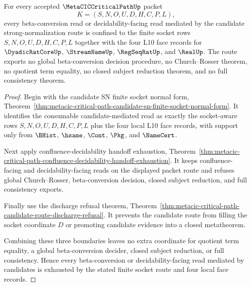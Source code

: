\begin{theorem}
\label{thm:metacic-critical-path-candidate-decider-exhaustion}
For every accepted $\MetaCICCriticalPathUp$ packet
$$
K=(S,N,O,U,D,H,C,P,L),
$$
every beta-conversion read or decidability-facing read mediated by the candidate strong-normalization route is confined to the finite socket rows $S,N,O,U,D,H,C,P,L$ together with the four L10 face records for $\DyadicRatCoreUp$, $\StreamNameUp$, $\RegSeqRatUp$, and $\RealUp$. The route exports no global beta-conversion decision procedure, no Church--Rosser theorem, no quotient term equality, no closed subject reduction theorem, and no full consistency theorem.
\end{theorem}
\begin{proof}
Begin with the candidate SN finite socket normal form, Theorem~\ref{thm:metacic-critical-path-candidate-sn-finite-socket-normal-form}. It identifies the consumable candidate-mediated read as exactly the socket-aware rows $S,N,O,U,D,H,C,P,L$ plus the four local L10 face records, with support only from $\BHist$, $\hsame$, $\Cont$, $\Pkg$, and $\NameCert$.

Next apply confluence-decidability handoff exhaustion, Theorem~\ref{thm:metacic-critical-path-confluence-decidability-handoff-exhaustion}. It keeps confluence-facing and decidability-facing reads on the displayed packet route and refuses global Church--Rosser, beta-conversion decision, closed subject reduction, and full consistency exports.

Finally use the discharge refusal theorem, Theorem~\ref{thm:metacic-critical-path-candidate-route-discharge-refusal}. It prevents the candidate route from filling the socket coordinate $D$ or promoting candidate evidence into a closed metatheorem.

Combining these three boundaries leaves no extra coordinate for quotient term equality, a global beta-conversion decider, closed subject reduction, or full consistency. Hence every beta-conversion or decidability-facing read mediated by candidates is exhausted by the stated finite socket route and four local face records.
\end{proof}

